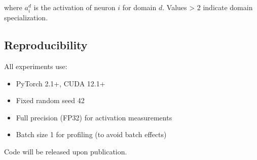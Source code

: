 \documentclass{article}
\begin{document}
where $a_i^d$ is the activation of neuron $i$ for domain $d$. Values > 2 indicate domain specialization.

\subsection{Reproducibility}

All experiments use:
\begin{itemize}
    \item PyTorch 2.1+, CUDA 12.1+
    \item Fixed random seed 42
    \item Full precision (FP32) for activation measurements
    \item Batch size 1 for profiling (to avoid batch effects)
\end{itemize}

Code will be released upon publication.
\end{document}
